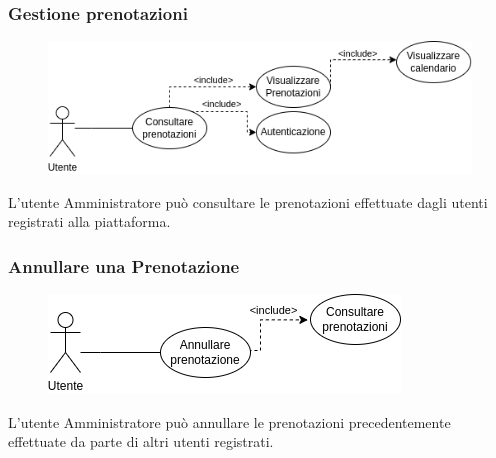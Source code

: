\documentclass{article}
\begin{document}
\subsubsection{Gestione prenotazioni}\label{rf_3}
\begin{description}
	
	\begin{figure}[htp]
		\centering
		\includegraphics[width=\textwidth]{rf3.png}
	\end{figure}
	
	\item L'utente Amministratore può consultare le prenotazioni effettuate dagli utenti registrati alla piattaforma.
\end{description}

\renewcommand\thesubsubsection{RF 4}
\subsubsection{Annullare una Prenotazione}\label{rf_4}
\begin{description}
	
	\begin{figure}[htp]
		\centering
		\includegraphics[]{rf4.png}
	\end{figure}
	
	\item L'utente Amministratore può annullare le prenotazioni precedentemente effettuate da parte di altri utenti registrati.
\end{description}

\clearpage

\renewcommand\thesubsubsection{RF 5}
\end{document}
